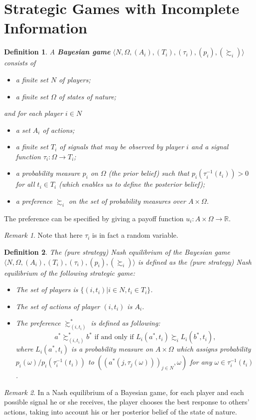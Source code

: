 \documentclass[openany]{book}
\newtheorem{definition}{Definition}[chapter]
\theoremstyle{remark}
\newtheorem*{remark}{Remark}
\begin{document}
\section{Strategic Games with Incomplete Information}
\begin{definition}\label{BayesGame}
A \textbf{Bayesian game} $\langle N,\Omega,(A_i),(T_i),(\tau_i),(p_i),(\succsim_i)\rangle$ consists of
\begin{itemize}
\item a finite set $N$ of players;
\item a finite set $\Omega$ of states of nature;
\end{itemize}
and for each player $i\in N$
\begin{itemize}
\item a set $A_i$ of actions;
\item a finite set $T_i$ of signals that may be observed by player $i$ and a signal function $\tau_i:\Omega\rightarrow T_i$;
\item a probability measure $p_i$ on $\Omega$ (the prior belief) such that $p_i(\tau_i^{-1}(t_i))>0$ for all $t_i\in T_i$ (which enables us to define the posterior belief);
\item a preference $\succsim_i$ on the set of probability measures over $A\times\Omega$.
\end{itemize}
\end{definition}
The preference can be specified by giving a payoff function $u_i:A\times\Omega\rightarrow\mathbb{R}$.
\begin{remark}
    Note that here $\tau_i$ is in fact a random variable.
\end{remark}

\begin{definition}\label{BayesNE}
The (pure strategy) Nash equilibrium of the Bayesian game $\langle N,\Omega,(A_i),(T_i),(\tau_i),(p_i),(\succsim_i)\rangle$ is defined as the (pure strategy) Nash equilibrium of the following strategic game:
\begin{itemize}
\item The set of players is $\{(i,t_i)|i\in N,t_i\in T_i\}$.
\item The set of actions of player $(i,t_i)$ is $A_i$.
\item The preference $\succsim_{(i,t_i)}^*$ is defined as following:
\begin{equation}
    a^*\succsim_{(i,t_i)}^*b^*\textrm{ if and only if }L_i(a^*,t_i)\succsim_iL_i(b^*,t_i),
\end{equation}
where $L_i(a^*,t_i)$ is a probability measure on $A\times\Omega$ which assigns probability $p_i(\omega)/p_i(\tau_i^{-1}(t_i))$ to $((a^*(j,\tau_j(\omega)))_{j\in N},\omega)$ for any $\omega\in\tau_i^{-1}(t_i)$.
\end{itemize}
\end{definition}
\begin{remark}
    In a Nash equilibrium of a Bayesian game, for each player and each possible signal he or she receives, the player chooses the best response to others' actions, taking into account his or her posterior belief of the state of nature.
\end{remark}
\end{document}
